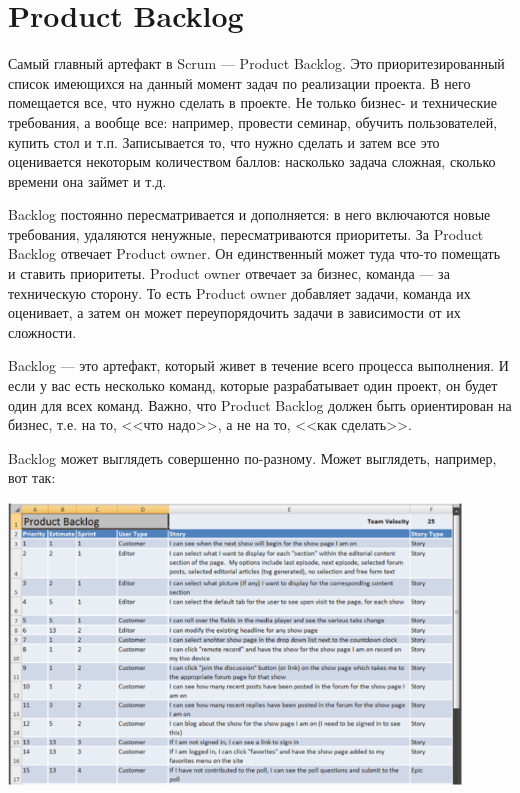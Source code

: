 \documentclass{../../text-style}
\begin{document}
\section{Product Backlog}

Самый главный артефакт в Scrum --- Product Backlog. Это приоритезированный список имеющихся на данный момент задач по реализации проекта. В него помещается все, что нужно сделать в проекте. Не только бизнес- и технические требования, а вообще все: например, провести семинар, обучить пользователей, купить стол и т.п. Записывается то, что нужно сделать и затем все это оценивается некоторым количеством баллов: насколько задача сложная, сколько времени она займет и т.д.

Backlog постоянно пересматривается и дополняется: в него включаются новые требования, удаляются ненужные, пересматриваются приоритеты. За Product Backlog отвечает Product owner. Он единственный может туда что-то помещать и ставить приоритеты. Product owner отвечает за бизнес, команда --- за техническую сторону. То есть Product owner добавляет задачи, команда их оценивает, а затем он может переупорядочить задачи в зависимости от их сложности.

Backlog --- это артефакт, который живет в течение всего процесса выполнения. И если у вас есть несколько команд, которые разрабатывает один проект, он будет один для всех команд. Важно, что Product Backlog должен быть ориентирован на бизнес, т.е. на то, <<что надо>>, а не на то, <<как сделать>>.

Backlog может выглядеть совершенно по-разному. Может выглядеть, например, вот так:

\begin{center}
    \includegraphics[width=0.9\textwidth]{backlog.png}
\end{center}
\end{document}
